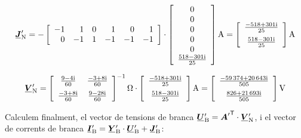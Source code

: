 \begin{exemple}
	\[
	\mcmplx{J}'\ped{N} = -
	\begin{bmatrix}\begin{array}{rrrrrr} 
			-1 & 1  & 0 &  1 & 0 & 1\\  0 & -1 & 1 & -1 & -1 & -1
	\end{array}\end{bmatrix} \cdot
	\begin{bmatrix}\begin{array}{c}
				0 \\ 0 \\ 0 \\ 0 \\ 0 \\ \frac{\complexnum{518-j301}}{25}
	\end{array}\end{bmatrix}\unit{A}
	=
	\begin{bmatrix}\begin{array}{c}
			\frac{\complexnum{-518+j301}}{25} \\[2mm]
			\frac{\complexnum{518-j301}}{25}
	\end{array}\end{bmatrix}\unit{A}
	\]

	\[
	\mcmplx{V}'\ped{N} =
	\begin{bmatrix}\begin{array}{cc}
			\frac{\complexnum{ 9 - j 4}}{60} & \frac{\complexnum{-3 + j 8}}{60} \\[2mm]
			\frac{\complexnum{-3 + j 8}}{60} & \frac{\complexnum{9 - j 28}}{60}
	\end{array}\end{bmatrix}^{-1}\unit{\ohm} \cdot
	\begin{bmatrix}\begin{array}{c}
			\frac{\complexnum{-518+j301}}{25} \\[2mm]
			\frac{\complexnum{518-j301}}{25}
	\end{array}\end{bmatrix}\unit{A}
	=
	\begin{bmatrix}\begin{array}{c}
		\frac{\complexnum{-59374+j20643}}{505} \\[2mm]
		\frac{\complexnum{826+j21693}}{505}
	\end{array}\end{bmatrix}\unit{V}
	\]
	
	Calculem finalment, el vector de tensions de branca $\mcmplx{U}'\ped{B} = \transpose{{\boldsymbol{A}'}} \cdot \mcmplx{V}'\ped{N}$, i el vector de corrents de branca 	$\mcmplx{I}'\ped{B} = \mcmplx{Y}'\ped{B} \cdot\mcmplx{U}'\ped{B} + \mcmplx{J}'\ped{B}$:
	

\end{exemple}
